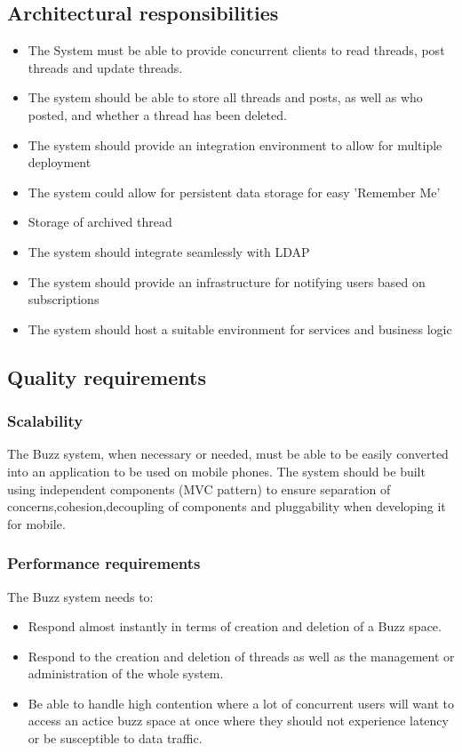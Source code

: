 \documentclass[10pt]{article}
\begin{document}
\subsection{Architectural responsibilities}  %
\begin{itemize}
	\item The System must be able to provide concurrent clients to read threads, post threads and update threads.
	\item The system should be able to store all threads and posts, as well as who posted, and whether a thread has been deleted.
	\item The system should provide an integration environment to allow for multiple deployment
	\item The system could allow for persistent data storage for easy 'Remember Me'
	\item Storage of archived thread
	\item The system should integrate seamlessly with LDAP
	\item The system should provide an infrastructure for notifying users based on subscriptions
	\item The system should host a suitable environment for services and business logic
\end{itemize}
\clearpage
\subsection{Quality requirements} %
\subsubsection{Scalability}

The  Buzz system, when necessary or needed,  must be able to be easily converted into an application to be used on mobile phones. The system should be built using independent components (MVC pattern)  to ensure separation of concerns,cohesion,decoupling of components and pluggability when developing it for mobile.

\subsubsection{Performance requirements}
The Buzz system needs to:
\begin{itemize}
\item Respond almost instantly in terms of creation and deletion of a Buzz space.
\item Respond to the creation and deletion of threads as well as the management or administration of the whole system.
\item Be able to handle high contention where a lot of concurrent users will want to access an actice buzz space at once where they should not experience latency or be susceptible to data traffic.
\end{itemize}
\end{document}
